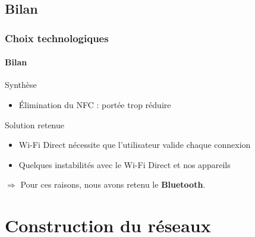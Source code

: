 \documentclass{beamer}
\begin{document}
    \subsection{Bilan}
    \begin{frame}
      \frametitle{Choix technologiques}
      \framesubtitle{Bilan}
      \begin{small}
        \begin{block}{Synthèse}
          \begin{itemize}
            \item {\small Élimination du NFC : portée trop réduire}
          \end{itemize}
          \begin{table}
            \begin{center}
            \end{center}
          \end{table}
        \end{block}
        \begin{block}{Solution retenue}
          \begin{itemize}
            \item Wi-Fi Direct nécessite que l'utilisateur valide chaque connexion
            \item Quelques instabilités avec le Wi-Fi Direct et nos appareils
          \end{itemize}
          $ \Rightarrow $ Pour ces raisons, nous avons retenu le \textbf{Bluetooth}.
        \end{block}
      \end{small}
    \end{frame}
  
  \section{Construction du réseaux}
  \begin{frame}
    \setcounter{tocdepth}{2}
	  \tableofcontents[currentsection]
  \end{frame}
\end{document}
